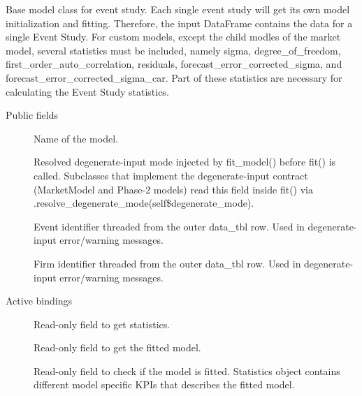 \documentclass[a4paper]{book}
\begin{document}
%
\begin{Description}
Base model class for event study. Each single event study will
get its own model initialization and fitting. Therefore, the input DataFrame
contains the data for a single Event Study. For custom models, except the
child modles of the market model, several statistics must be included, namely
sigma, degree\_of\_freedom, first\_order\_auto\_correlation, residuals,
forecast\_error\_corrected\_sigma, and forecast\_error\_corrected\_sigma\_car. Part
of these statistics are necessary for calculating the Event Study statistics.
\end{Description}
%
\begin{Section}{Public fields}

\begin{description}

\item[] Name of the model.

\item[] Resolved degenerate-input mode injected by
fit\_model() before fit() is called. Subclasses that implement the
degenerate-input contract (MarketModel and Phase-2 models) read this
field inside fit() via .resolve\_degenerate\_mode(self\$degenerate\_mode).

\item[] Event identifier threaded from the outer data\_tbl row.
Used in degenerate-input error/warning messages.

\item[] Firm identifier threaded from the outer data\_tbl row.
Used in degenerate-input error/warning messages.

\end{description}


\end{Section}
%
\begin{Section}{Active bindings}

\begin{description}

\item[] Read-only field to get statistics.

\item[] Read-only field to get the fitted model.

\item[] Read-only field to check if the model is fitted.
Statistics object contains different model specific KPIs
that describes the fitted model.

\end{description}


\end{Section}
\end{document}
